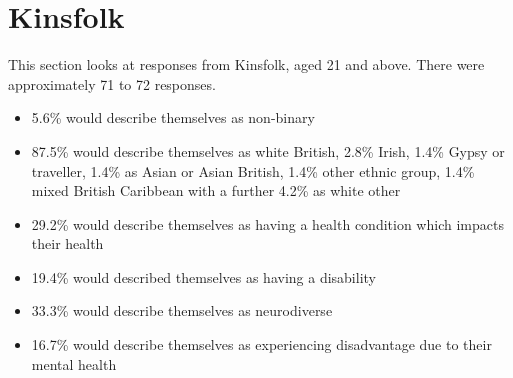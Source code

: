 \section{Kinsfolk}
This section looks at responses from Kinsfolk, aged 21 and above. There were approximately 71 to 72 responses.
\begin{itemize}
    \item 5.6\% would describe themselves as non-binary
    \item 87.5\% would describe themselves as white British, 2.8\% Irish, 1.4\% Gypsy or traveller, 1.4\% as Asian or Asian British, 1.4\% other ethnic group, 1.4\% mixed British Caribbean with a further 4.2\% as white other
    \item 29.2\% would describe themselves as having a health condition which impacts their health
    \item 19.4\% would described themselves as having a disability
    \item 33.3\% would describe themselves as neurodiverse
    \item 16.7\% would describe themselves as experiencing disadvantage due to their mental health
\end{itemize}

